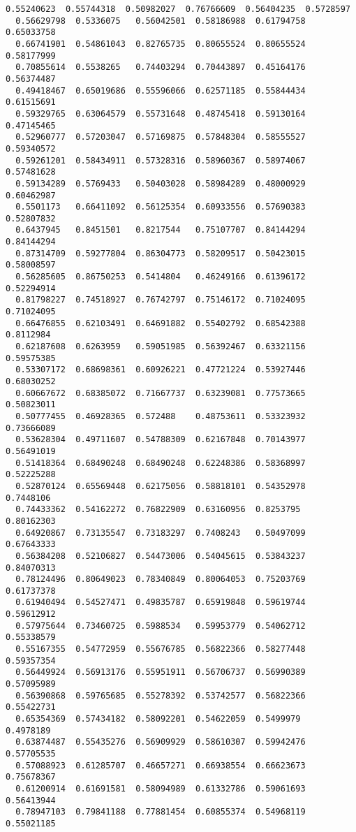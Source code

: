 \documentclass[11pt]{article}
\begin{document}
\begin{Verbatim}[commandchars=\\\{\}]
  0.55240623  0.55744318  0.50982027  0.76766609  0.56404235  0.5728597
  0.56629798  0.5336075   0.56042501  0.58186988  0.61794758  0.65033758
  0.66741901  0.54861043  0.82765735  0.80655524  0.80655524  0.58177999
  0.70855614  0.5538265   0.74403294  0.70443897  0.45164176  0.56374487
  0.49418467  0.65019686  0.55596066  0.62571185  0.55844434  0.61515691
  0.59329765  0.63064579  0.55731648  0.48745418  0.59130164  0.47145465
  0.52960777  0.57203047  0.57169875  0.57848304  0.58555527  0.59340572
  0.59261201  0.58434911  0.57328316  0.58960367  0.58974067  0.57481628
  0.59134289  0.5769433   0.50403028  0.58984289  0.48000929  0.60462987
  0.5501173   0.66411092  0.56125354  0.60933556  0.57690383  0.52807832
  0.6437945   0.8451501   0.8217544   0.75107707  0.84144294  0.84144294
  0.87314709  0.59277804  0.86304773  0.58209517  0.50423015  0.58008597
  0.56285605  0.86750253  0.5414804   0.46249166  0.61396172  0.52294914
  0.81798227  0.74518927  0.76742797  0.75146172  0.71024095  0.71024095
  0.66476855  0.62103491  0.64691882  0.55402792  0.68542388  0.8112984
  0.62187608  0.6263959   0.59051985  0.56392467  0.63321156  0.59575385
  0.53307172  0.68698361  0.60926221  0.47721224  0.53927446  0.68030252
  0.60667672  0.68385072  0.71667737  0.63239081  0.77573665  0.50823011
  0.50777455  0.46928365  0.572488    0.48753611  0.53323932  0.73666089
  0.53628304  0.49711607  0.54788309  0.62167848  0.70143977  0.56491019
  0.51418364  0.68490248  0.68490248  0.62248386  0.58368997  0.52225288
  0.52870124  0.65569448  0.62175056  0.58818101  0.54352978  0.7448106
  0.74433362  0.54162272  0.76822909  0.63160956  0.8253795   0.80162303
  0.64920867  0.73135547  0.73183297  0.7408243   0.50497099  0.67643333
  0.56384208  0.52106827  0.54473006  0.54045615  0.53843237  0.84070313
  0.78124496  0.80649023  0.78340849  0.80064053  0.75203769  0.61737378
  0.61940494  0.54527471  0.49835787  0.65919848  0.59619744  0.59612912
  0.57975644  0.73460725  0.5988534   0.59953779  0.54062712  0.55338579
  0.55167355  0.54772959  0.55676785  0.56822366  0.58277448  0.59357354
  0.56449924  0.56913176  0.55951911  0.56706737  0.56990389  0.57095989
  0.56390868  0.59765685  0.55278392  0.53742577  0.56822366  0.55422731
  0.65354369  0.57434182  0.58092201  0.54622059  0.5499979   0.4978189
  0.63874487  0.55435276  0.56909929  0.58610307  0.59942476  0.57705535
  0.57088923  0.61285707  0.46657271  0.66938554  0.66623673  0.75678367
  0.61200914  0.61691581  0.58094989  0.61332786  0.59061693  0.56413944
  0.78947103  0.79841188  0.77881454  0.60855374  0.54968119  0.55021185

\end{Verbatim}
\end{document}
